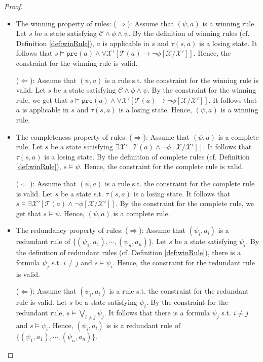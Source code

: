 \documentclass[review]{elsarticle}
\newcommand{\set}[1]{\{ #1 \}}
\newcommand{\statevar}{\mathcal{X}}
\newcommand{\trans}{\mathcal{T}}
\newcommand{\constraint}{\mathcal{C}}
\newcommand{\pre}{\mathtt{pre}}
\newcommand{\suc}{\tau}
\begin{document}
\begin{proof}
	\begin{itemize}
		\item The winning property of rules: ($\Rightarrow$): Assume that $(\psi, a)$ is a winning rule.
		Let $s$ be a state satisfying $\constraint \land \phi \land \psi$.
		By the definition of winning rules (cf. Definition \ref{def:winRule}), $a$ is applicable in $s$ and $\suc(s, a)$ is a losing state.
		It follows that $s \models \pre(a) \land \forall \statevar' [\trans(a) \rightarrow \neg \phi[\statevar/\statevar']]$.
		Hence, the constraint for the winning rule is valid.
		
		($\Leftarrow$): Assume that $(\psi, a)$ is a rule s.t. the constraint for the winning rule is valid.
		Let $s$ be a state satisfying $\constraint \land \phi \land \psi$.
		By the constraint for the winning rule, we get that $s \models \pre(a) \land \forall \statevar' [\trans(a) \rightarrow \neg \phi[\statevar/\statevar']]$.
		It follows that $a$ is applicable in $s$ and $\suc(s, a)$ is a losing state.
		Hence, $(\psi, a)$ is a winning rule.
		
		\item The completeness property of rules: ($\Rightarrow$): Assume that $(\psi, a)$ is a complete rule.
		Let $s$ be a state satisfying $\exists \statevar' [\trans(a) \land \neg \phi[\statevar/\statevar']]$.
		It follows that $\suc(s, a)$ is a losing state.	
		By the definition of complete rules (cf. Definition \ref{def:winRule}), $s \models \psi$.
		Hence, the constraint for the complete rule is valid.
		
		($\Leftarrow$): Assume that $(\psi, a)$ is a rule s.t. the constraint for the complete rule is valid.
		Let $s$ be a state s.t. $\suc(s, a)$ is a losing state.
		It follows that $s \models \exists \statevar' [\trans(a) \land \neg \phi[\statevar/\statevar']]$.
		By the constraint for the complete rule, we get that $s \models \psi$.
		Hence, $(\psi, a)$ is a complete rule.	
		
		\item The redundancy property of rules: ($\Rightarrow$): Assume that $(\psi_i, a_i)$ is a redundant rule of $\set{(\psi_1, a_1), \cdots, (\psi_n, a_n)}$.
		Let $s$ be a state satisfying $\psi_i$.
		By the definition of redundant rules (cf. Definition \ref{def:winRule}), there is a formula $\psi_j$ s.t. $i \neq j$ and $s \models \psi_i$.
		Hence, the constraint for the redundant rule is valid.
		
		($\Leftarrow$): Assume that $(\psi_i, a_i)$ is a rule s.t. the constraint for the redundant rule is valid.
		Let $s$ be a state satisfying $\psi_i$.
		By the constraint for the redundant rule, $s \models \bigvee_{i \neq j} \psi_j$.
		It follows that there is a formula $\psi_j$ s.t. $i \neq j$ and $s \models \psi_i$.	
		Hence, $(\psi_i, a_i)$ is is a redundant rule of $\set{(\psi_1, a_1), \cdots, (\psi_n, a_n)}$.		
		

\end{itemize}
\end{proof}
\end{document}
